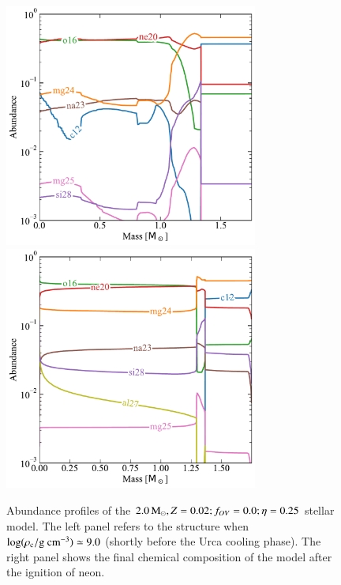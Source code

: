 \documentclass[main.tex]{subfiles}
\begin{document}
\begin{subappendices}
\begin{figure}[hbt!]
    \centering 
    \includegraphics[height=8cm]{figures/chapter2/abundances/2p0_eta0p25_Rho9.pdf}\quad
    \includegraphics[height=8cm]{figures/chapter2/abundances/2p0_eta0p25_final_abun.pdf}
    \caption{Abundance profiles of the \seriestwo $ 2.0\mathrm{\,M_\odot},  Z=0.02;f_{OV}=0.0; \eta=0.25$ stellar model. The left panel refers to the structure when $\rm \log(\rho_c / g \ cm^{-3}) \simeq 9.0$ (shortly before the Urca cooling phase). The right panel shows the final chemical composition of the model after the ignition of neon.}
    \label{apx:fig:eta0p25}
\end{figure}


\end{subappendices}
\end{document}
